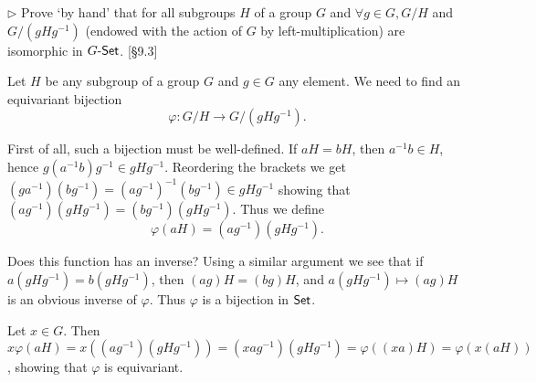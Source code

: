 \begin{problem}
	$\triangleright$ Prove `by hand' that for all subgroups $H$ of a group $G$ and $\forall g \in G, G/H$ and $G/(gHg^{-1})$ (endowed with the action of $G$ by left-multiplication) are isomorphic in $G\text{-}\mathsf{Set}$. [\S 9.3]
\end{problem}

\begin{solution}
	Let $H$ be any subgroup of a group $G$ and $g \in G$ any element. We need to find an equivariant bijection
	\[
		\varphi: G/H \to G/(gHg^{-1}) \text{.}
	\]
	
	First of all, such a bijection must be well-defined. If $aH = bH$, then $a^{-1}b \in H$, hence $g(a^{-1}b)g^{-1} \in gHg^{-1}$. Reordering the brackets we get $(ga^{-1})(bg^{-1}) = (ag^{-1})^{-1}(bg^{-1}) \in gHg^{-1}$ showing that $(ag^{-1})(gHg^{-1}) = (bg^{-1})(gHg^{-1})$. Thus we define
	\[
		\varphi(aH) = (ag^{-1})(gHg^{-1}) \text{.}
	\]
	
	Does this function has an inverse? Using a similar argument we see that if $a(gHg^{-1}) = b(gHg^{-1})$, then $(ag)H = (bg)H$, and $a(gHg^{-1}) \mapsto (ag)H$ is an obvious inverse of $\varphi$. Thus $\varphi$ is a bijection in $\mathsf{Set}$.
	
	Let $x \in G$. Then $x \varphi(aH) = x ((ag^{-1}) (gHg^{-1})) = (xag^{-1})(gHg^{-1}) = \varphi((xa)H) = \varphi(x (aH))$, showing that $\varphi$ is equivariant.
\end{solution}

